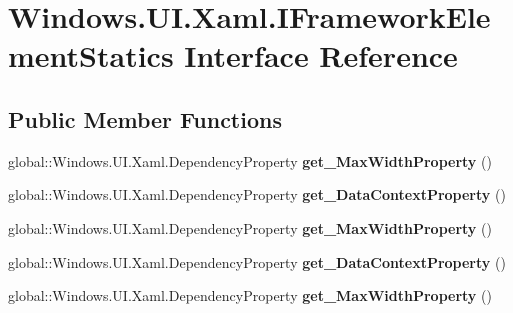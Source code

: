 \hypertarget{interface_windows_1_1_u_i_1_1_xaml_1_1_i_framework_element_statics}{}\section{Windows.\+U\+I.\+Xaml.\+I\+Framework\+Element\+Statics Interface Reference}
\label{interface_windows_1_1_u_i_1_1_xaml_1_1_i_framework_element_statics}
\subsection*{Public Member Functions}
\begin{DoxyCompactItemize}
\item 
\mbox{\label{interface_windows_1_1_u_i_1_1_xaml_1_1_i_framework_element_statics_a39f51f7e53674984060eaa3b0e31e689}} 
global\+::\+Windows.\+U\+I.\+Xaml.\+Dependency\+Property {\bfseries get\+\_\+\+Max\+Width\+Property} ()
\item 
\mbox{\label{interface_windows_1_1_u_i_1_1_xaml_1_1_i_framework_element_statics_afb558b91e7c46ece6685fec26f7cb5be}} 
global\+::\+Windows.\+U\+I.\+Xaml.\+Dependency\+Property {\bfseries get\+\_\+\+Data\+Context\+Property} ()
\item 
\mbox{\label{interface_windows_1_1_u_i_1_1_xaml_1_1_i_framework_element_statics_a39f51f7e53674984060eaa3b0e31e689}} 
global\+::\+Windows.\+U\+I.\+Xaml.\+Dependency\+Property {\bfseries get\+\_\+\+Max\+Width\+Property} ()
\item 
\mbox{\label{interface_windows_1_1_u_i_1_1_xaml_1_1_i_framework_element_statics_afb558b91e7c46ece6685fec26f7cb5be}} 
global\+::\+Windows.\+U\+I.\+Xaml.\+Dependency\+Property {\bfseries get\+\_\+\+Data\+Context\+Property} ()
\item 
\mbox{\label{interface_windows_1_1_u_i_1_1_xaml_1_1_i_framework_element_statics_a39f51f7e53674984060eaa3b0e31e689}} 
global\+::\+Windows.\+U\+I.\+Xaml.\+Dependency\+Property {\bfseries get\+\_\+\+Max\+Width\+Property} ()

\end{DoxyCompactItemize}
